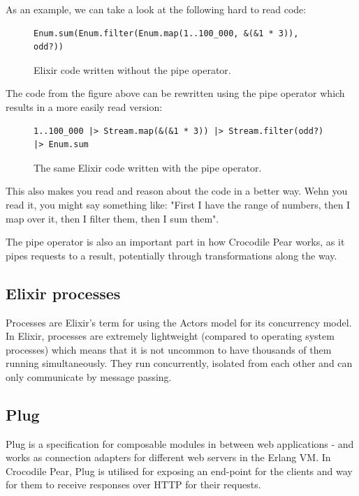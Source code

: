\documentclass{cslthse-msc}
\begin{document}
As an example, we can take a look at the following hard to read code:

\begin{figure}[H]
  \centering
\begin{lstlisting}[breaklines=true,frame=single]
Enum.sum(Enum.filter(Enum.map(1..100_000, &(&1 * 3)), odd?))
\end{lstlisting}
  \caption{Elixir code written without the pipe operator.}
\end{figure}

The code from the figure above can be rewritten using the pipe operator which results in a more easily read version:

\begin{figure}[H]
  \centering
\begin{lstlisting}[breaklines=true,frame=single]
1..100_000 |> Stream.map(&(&1 * 3)) |> Stream.filter(odd?) |> Enum.sum
\end{lstlisting}
  \caption{The same Elixir code written with the pipe operator.}
\end{figure}

This also makes you read and reason about the code in a better way. Wehn you read it, you might say something like: "First I have the range of numbers, then I map over it, then I filter them, then I sum them".

The pipe operator is also an important part in how Crocodile Pear works, as it pipes requests to a result, potentially through transformations along the way.

\subsection{Elixir processes}
Processes are Elixir's term for using the Actors model for its concurrency model. In Elixir, processes are extremely lightweight (compared to operating system processes) which means that it is not uncommon to have thousands of them running simultaneously. They run concurrently, isolated from each other and can only communicate by message passing\cite{elixir_processes}.

\subsection{Plug}
Plug is a specification for composable modules in between web applications - and works as connection adapters for different web servers in the Erlang VM\cite{plug}. In Crocodile Pear, Plug is utilised for exposing an end-point for the clients and way for them to receive responses over HTTP for their requests.
\end{document}
